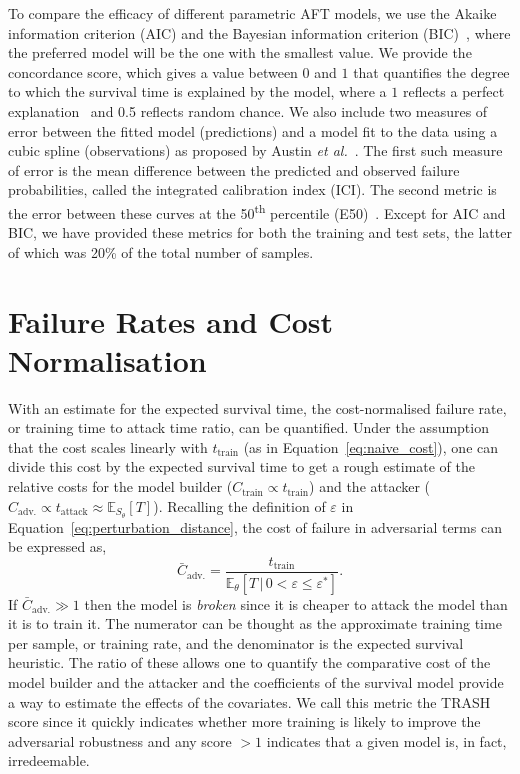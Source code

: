 To compare the efficacy of different parametric AFT models, we use the Akaike information criterion (AIC) and the Bayesian information criterion (BIC)~\cite{stoica2004model}, where the preferred model will be the one with the smallest value. We provide the
concordance score, which gives a value between $0$ and $1$ that quantifies the degree to which the survival time is explained by the model, where a $1$ reflects a perfect explanation~\cite{uno2011c} and 0.5 reflects random chance.
We also include two measures of error between the fitted model (predictions) and a model fit to the data using a cubic spline (observations) as proposed by Austin \textit{et al.}~\cite{ici}.
The first such measure of error is the mean difference between the predicted and observed failure probabilities,  called the integrated calibration index (ICI).
The second metric is the error between these curves at the 50\textsuperscript{th} percentile (E50)~\cite{ici}.
Except for AIC and BIC, we have provided these metrics for both the training and test sets, the latter of which was 20\% of the total number of samples.

\section{Failure Rates and Cost Normalisation}
\label{cost_normalization}

With an estimate for the expected survival time, the cost-normalised failure rate, or training time to attack time ratio, can be quantified.
Under the assumption that the cost scales linearly with $t_{\mathrm{train}}$ (as in Equation~\ref{eq:naive_cost}), one can divide this cost by the expected survival time to get a rough estimate of the relative costs for the model builder ($C_{\mathrm{train}} \propto t_{\mathrm{train}}$) and the attacker ($C_{\mathrm{adv.}} \propto t_{\mathrm{attack}} \approx \mathbb{E}_{S_\theta}[T]$). Recalling the definition of $\varepsilon$ in Equation~\ref{eq:perturbation_distance}, the cost of failure in adversarial terms can be expressed as,
\begin{equation}
	\bar{C}_{\mathrm{adv.}}=\frac{t_{\mathrm{train}}}{\mathbb{E}_{\theta}[T \,|\, 0 < \varepsilon \leq \varepsilon^*]}.
	\label{eq:cost}
\end{equation}
If $\bar{C}_{\mathrm{adv.}} \gg 1$  then the model is \textit{broken} since it is cheaper to attack the model than it is to train it.
The numerator can be thought as the approximate training time per sample, or training rate, and the denominator is the expected survival heuristic.
The ratio of these allows one to quantify the comparative cost of the model builder and the attacker and the coefficients of the survival model provide a way to estimate the effects of the covariates.
We call this metric the TRASH score since it quickly indicates whether more training is likely to improve the adversarial robustness and any score $ > 1$ indicates that a given model is, in fact, irredeemable.

